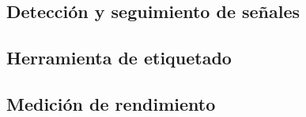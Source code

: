 \subsection{Detección y seguimiento de señales}	
	

\subsection{Herramienta de etiquetado}
	
	
\subsection{Medición de rendimiento}
	
